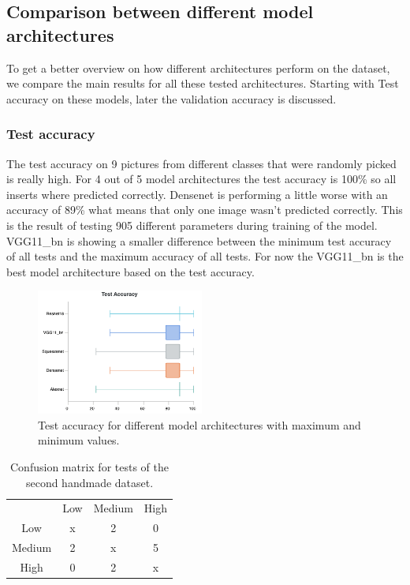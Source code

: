 \subsection{Comparison between different model architectures}
	To get a better overview on how different architectures perform on the dataset, we compare the main results for all these tested architectures. Starting with Test accuracy on these models, later the validation accuracy is discussed.
	
	\subsubsection{Test accuracy}
	The test accuracy on 9 pictures from different classes that were randomly picked is really high. For 4 out of 5 model architectures the test accuracy is 100\% so all inserts where predicted correctly. Densenet is performing a little worse with an accuracy of 89\% what means that only one image wasn't predicted correctly. This is the result of testing 905 different parameters during training of the model. VGG11\_bn is showing a smaller difference between the minimum test accuracy of all tests and the maximum accuracy of all tests. For now the VGG11\_bn is the best model architecture based on the test accuracy.
	
	\begin{figure}[hbtp]
		\centering
		\includegraphics[width=0.49\textwidth]{fig/results/wandb/second_handmade_sweep/charts/test_accuracy_boxplot.png}
		\caption{Test accuracy for different model architectures with maximum and minimum values.}
	\end{figure}
	
	\begin{table}
	\centering
	\caption{Confusion matrix for tests of the second handmade dataset.}
		\begin{tabular}{ c c c c }
						& Low 	& Medium & High	\\
		 Low 			& x 		& 2 			& 0		\\ 
		 Medium 	& 2 		& x 			& 5 		\\  
		 High 		& 0 		& 2 			& x   
		\end{tabular}
		\label{tab:results:shm:confusion}
		\end{table}
	
